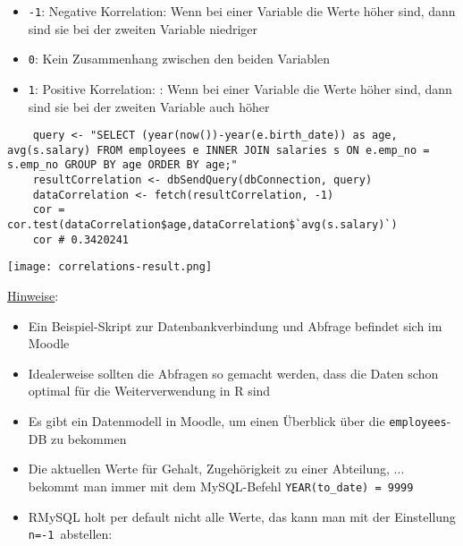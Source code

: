 \documentclass{article}
\begin{document}
\begin{itemize}
	\item \texttt{-1}: Negative Korrelation: Wenn bei einer Variable die Werte höher sind, dann sind sie bei der zweiten Variable niedriger
	\item \texttt{0}: Kein Zusammenhang zwischen den beiden Variablen
	\item \texttt{1}: Positive Korrelation: : Wenn bei einer Variable die Werte höher sind, dann sind sie bei der zweiten Variable auch höher
\end{itemize}
\newpage
\begin{lstlisting}
	query <- "SELECT (year(now())-year(e.birth_date)) as age, avg(s.salary) FROM employees e INNER JOIN salaries s ON e.emp_no = s.emp_no GROUP BY age ORDER BY age;"
	resultCorrelation <- dbSendQuery(dbConnection, query)
	dataCorrelation <- fetch(resultCorrelation, -1)
	cor = cor.test(dataCorrelation$age,dataCorrelation$`avg(s.salary)`)
	cor # 0.3420241
\end{lstlisting}
\texttt{[image: correlations-result.png]}
 
 
\underline{Hinweise}: 


\begin{itemize}
	\item Ein Beispiel-Skript zur Datenbankverbindung und Abfrage befindet sich im Moodle
	\item Idealerweise sollten die Abfragen so gemacht werden, dass die Daten schon optimal für die Weiterverwendung in R sind
	\item Es gibt ein Datenmodell in Moodle, um einen Überblick über die \texttt{employees}-DB zu bekommen
	\item Die aktuellen Werte für Gehalt, Zugehörigkeit zu einer Abteilung, ... bekommt man immer mit dem MySQL-Befehl \texttt{YEAR(to\_date) = 9999}
	\item RMySQL holt per default nicht alle Werte, das kann man mit der Einstellung \texttt{n=-1 }abstellen:
\end{itemize}	
	
\end{document}
